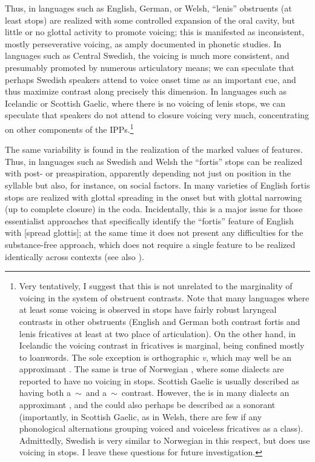 Thus, in languages such as English, German, or Welsh, \enquote{lenis} obstruents (at least stops) are realized with some controlled expansion of the oral cavity, but little or no glottal activity to promote voicing; this is manifested as inconsistent, mostly perseverative voicing, as amply documented in phonetic studies. In languages such as Central Swedish, the voicing is much more consistent, and presumably promoted by numerous articulatory means; we can speculate that perhaps Swedish speakers attend to voice onset time as an important cue, and thus maximize contrast along precisely this dimension. In languages such as Icelandic or Scottish Gaelic, where there is no voicing of lenis stops, we can speculate that speakers do not attend to closure voicing very much, concentrating on other components of the IPPs.\footnote{Very tentatively, I suggest that this is not unrelated to the marginality of voicing in the system of obstruent contrasts. Note that many languages where at least some voicing is observed in stops have fairly robust laryngeal contrasts in other obstruents (English and German both contrast fortis and lenis fricatives at least at two place of articulation). On the other hand, in Icelandic the voicing contrast in fricatives is marginal, being confined mostly to loanwords. The sole exception is orthographic \emph{v}, which may well be an approximant \ipa{[ʋ]} \citep{arnason11:_icelan_faroes}. The same is true of Norwegian \citep{kristoffersen00:_norweg}, where some dialects are reported to have no voicing in stops. Scottish Gaelic is usually described as having both a \ipa{[f]}\,$\sim$\,\ipa{[v]} and a \ipa{[x]}\,$\sim$\,\ipa{[ɣ]} contrast. However, the \ipa{[v]} is in many dialects an approximant \ipa{[w]}, and the \ipa{[ɣ]} could also perhaps be described as a sonorant (importantly, in Scottish Gaelic, as in Welsh, there are few if any phonological alternations grouping voiced and voiceless fricatives as a class). Admittedly, Swedish is very similar to Norwegian in this respect, but does use voicing in stops. I leave these questions for future investigation.}

The same variability is found in the realization of the marked values of features. Thus, in languages such as Swedish \citep{helgason} and Welsh \citep{morris10:_phonet_north_wales} the \enquote{fortis} stops can be realized with post- or preaspiration, apparently depending not just on position in the syllable but also, for instance, on social factors. In many varieties of English fortis stops are realized with glottal spreading in the onset but with glottal narrowing (up to complete closure) in the coda. Incidentally, this is a major issue for those essentialist approaches that specifically identify the \enquote{fortis} feature of English with [spread glottis]; at the same time it does not present any difficulties for the substance\hyp free approach, which does not require a single feature to be realized identically across contexts (see also \citealp{avery01:_laryn}).


